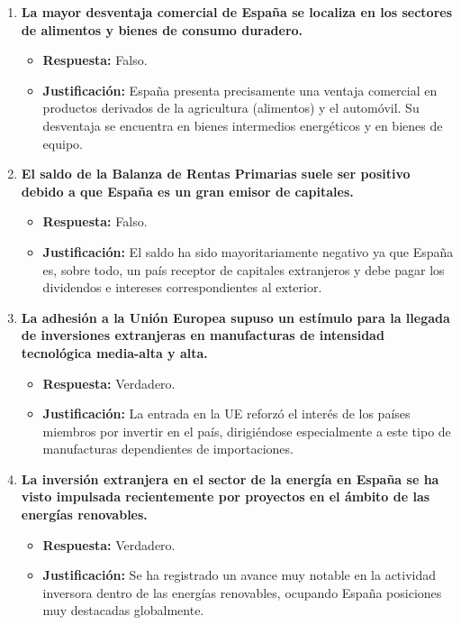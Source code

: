 \begin{enumerate}[label=\textbf{Pregunta \arabic*:}, leftmargin=*, itemsep=4ex]
\item \textbf{La mayor desventaja comercial de España se localiza en los sectores de alimentos y bienes de consumo duradero.}
    \begin{itemize}
        \item \textbf{Respuesta:} \textcolor{red!80!black}{Falso.}
        \item \textbf{Justificación:} España presenta precisamente una ventaja comercial en productos derivados de la agricultura (alimentos) y el automóvil. Su desventaja se encuentra en bienes intermedios energéticos y en bienes de equipo.
    \end{itemize}

\item \textbf{El saldo de la Balanza de Rentas Primarias suele ser positivo debido a que España es un gran emisor de capitales.}
    \begin{itemize}
        \item \textbf{Respuesta:} \textcolor{red!80!black}{Falso.}
        \item \textbf{Justificación:} El saldo ha sido mayoritariamente negativo ya que España es, sobre todo, un país receptor de capitales extranjeros y debe pagar los dividendos e intereses correspondientes al exterior.
    \end{itemize}

\item \textbf{La adhesión a la Unión Europea supuso un estímulo para la llegada de inversiones extranjeras en manufacturas de intensidad tecnológica media-alta y alta.}
    \begin{itemize}
        \item \textbf{Respuesta:} \textcolor{blue!80!black}{Verdadero.}
        \item \textbf{Justificación:} La entrada en la UE reforzó el interés de los países miembros por invertir en el país, dirigiéndose especialmente a este tipo de manufacturas dependientes de importaciones.
    \end{itemize}

\item \textbf{La inversión extranjera en el sector de la energía en España se ha visto impulsada recientemente por proyectos en el ámbito de las energías renovables.}
    \begin{itemize}
        \item \textbf{Respuesta:} \textcolor{blue!80!black}{Verdadero.}
        \item \textbf{Justificación:} Se ha registrado un avance muy notable en la actividad inversora dentro de las energías renovables, ocupando España posiciones muy destacadas globalmente.
    \end{itemize}


\end{enumerate}
